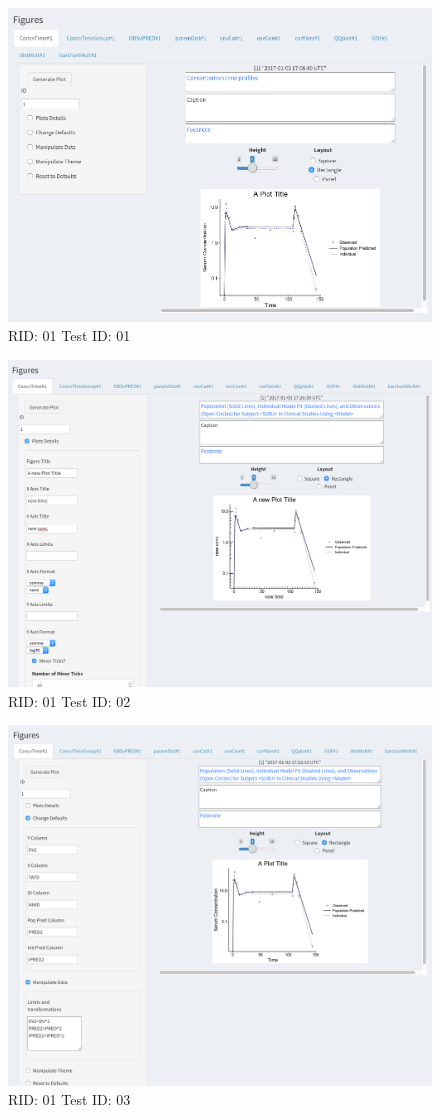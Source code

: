 \begin{figure}[H]
\includegraphics[width=.8\textwidth]{screencaps/01-01-1.png}
\caption{RID: 01 Test ID: 01}
\end{figure}
\begin{figure}[H]
\includegraphics[width=.8\textwidth]{screencaps/01-02-1.png}
\caption{RID: 01 Test ID: 02}
\end{figure}
\begin{figure}[H]
\includegraphics[width=.8\textwidth]{screencaps/01-03-1.png}
\caption{RID: 01 Test ID: 03}
\end{figure}
